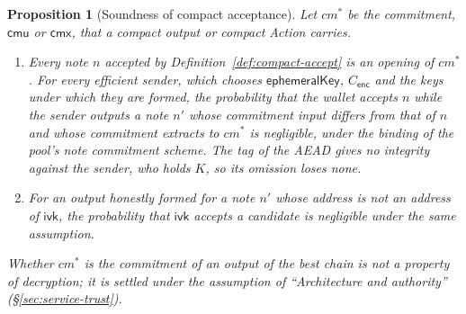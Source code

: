 \documentclass[11pt,a4paper]{article}
\newtheorem{proposition}[theorem]{Proposition}
\theoremstyle{definition}
\newcommand{\cmx}{\mathsf{cmx}}
\newcommand{\ivk}{\ensuremath{\mathsf{ivk}}}
\begin{document}
\begin{proposition}[Soundness of compact acceptance]\label{prop:compact-sound}
Let $\mathit{cm}^{*}$ be the commitment, $\mathsf{cmu}$ or $\cmx$, that a
compact output or compact Action carries.
\begin{enumerate}[label=(\alph*)]
\item Every note $n$ accepted by Definition~\ref{def:compact-accept} is an
  opening of $\mathit{cm}^{*}$. For every efficient sender, which chooses
  $\mathsf{ephemeralKey}$, $C_{\mathsf{enc}}$ and the keys under which they
  are formed, the probability that the wallet accepts $n$ while the sender
  outputs a note $n'$ whose commitment input differs from that of $n$ and
  whose commitment extracts to $\mathit{cm}^{*}$ is negligible, under the
  binding of the pool's note commitment scheme. The tag of the AEAD gives no
  integrity against the sender, who holds $K$, so its omission loses none.
\item For an output honestly formed for a note $n'$ whose address is not an
  address of $\ivk$, the probability that $\ivk$ accepts a candidate is
  negligible under the same assumption.
\end{enumerate}
Whether $\mathit{cm}^{*}$ is the commitment of an output of the best chain
is not a property of decryption; it is settled under the assumption of
``Architecture and authority'' (\S\ref{sec:service-trust}).
\end{proposition}
\end{document}
